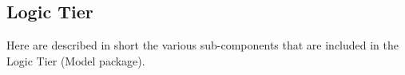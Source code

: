 \documentclass[../../../../../../dd.tex]{subfiles}
\begin{document}
	\subsection{Logic Tier}
		Here are described in short the various sub-components that are included in the Logic Tier (Model package).

		

		

		

		


	
\end{document}
